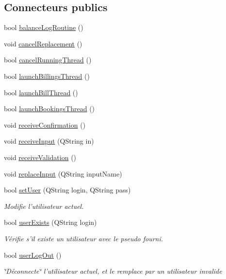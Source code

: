 \subsection*{Connecteurs publics}
\begin{DoxyCompactItemize}
\item 
bool \hyperlink{classSimpleHotel_1_1SH__ApplicationCore_a4b68e08dc74e6ed5a8f63d581ea5207c}{balance\-Log\-Routine} ()
\item 
void \hyperlink{classSimpleHotel_1_1SH__ApplicationCore_a315a26953ece50293e7d2e50bb6429f7}{cancel\-Replacement} ()
\item 
bool \hyperlink{classSimpleHotel_1_1SH__ApplicationCore_a146358caa7f379dc02cd902bf7c9a674}{cancel\-Running\-Thread} ()
\item 
bool \hyperlink{classSimpleHotel_1_1SH__ApplicationCore_a62e16d4d7aa5bac832cb5556a7dabd4a}{launch\-Billings\-Thread} ()
\item 
bool \hyperlink{classSimpleHotel_1_1SH__ApplicationCore_a5e72b1bc2e023f4fc5c2f5dd2ab75b2a}{launch\-Bill\-Thread} ()
\item 
bool \hyperlink{classSimpleHotel_1_1SH__ApplicationCore_a8ef0ab8ffaf580b63541d366e2db77fc}{launch\-Bookings\-Thread} ()
\item 
void \hyperlink{classSimpleHotel_1_1SH__ApplicationCore_a0b2a0302185a40aecf01bb3e9eb17e12}{receive\-Confirmation} ()
\item 
void \hyperlink{classSimpleHotel_1_1SH__ApplicationCore_ac4fc52911ea786bd99bdc8d78153a7ff}{receive\-Input} (Q\-String in)
\item 
void \hyperlink{classSimpleHotel_1_1SH__ApplicationCore_ae597b1ac2cc9efb4fe0a61df806bd81a}{receive\-Validation} ()
\item 
void \hyperlink{classSimpleHotel_1_1SH__ApplicationCore_ae6e8bc23c61759f03dfa3412db8935f6}{replace\-Input} (Q\-String input\-Name)
\item 
bool \hyperlink{classSimpleHotel_1_1SH__ApplicationCore_a2af3f48e113eaa6771a0fa328bd9f2e1}{set\-User} (Q\-String login, Q\-String pass)
\begin{DoxyCompactList}\small\item\em Modifie l'utilisateur actuel. \end{DoxyCompactList}\item 
bool \hyperlink{classSimpleHotel_1_1SH__ApplicationCore_a3cd7ead16ca60500883f7888f4d39362}{user\-Exists} (Q\-String login)
\begin{DoxyCompactList}\small\item\em Vérifie s'il existe un utilisateur avec le pseudo fourni. \end{DoxyCompactList}\item 
bool \hyperlink{classSimpleHotel_1_1SH__ApplicationCore_a6762ae5436349879687fee53d14bd117}{user\-Log\-Out} ()
\begin{DoxyCompactList}\small\item\em \char`\"{}\-Déconnecte\char`\"{} l'utilisateur actuel, et le remplace par un utilisateur invalide \end{DoxyCompactList}\end{DoxyCompactItemize}
